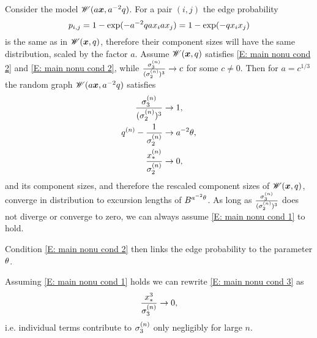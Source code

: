 Consider the model $\mathscr{W}(a\boldsymbol{x}, a^{-2}q)$.
For a pair $(i,j)$ the edge probability
\begin{equation}
	p_{i,j} = 1 - \exp(-a^{-2}q ax_iax_j) = 1 - \exp(-q x_ix_j)
\end{equation}
is the same as in $\mathscr{W}(\boldsymbol{x}, q)$,
therefore their component sizes will have the same distribution,
scaled by the factor $a$.
Assume $\mathscr{W}(\boldsymbol{x}, q)$ satisfies \eqref{E: main nonu cond 2} and \eqref{E: main nonu cond 2},
while $\frac{\sigma^{(n)}_3}{(\sigma^{(n)}_2)^3} \rightarrow c$ for some $c \neq 0$.
Then for $a = c^{1/3}$ the random graph $\mathscr{W}(a\boldsymbol{x}, a^{-2}q)$ satisfies
\begin{equation}
	\begin{aligned}
	\frac{\sigma^{(n)}_3}{(\sigma^{(n)}_2)^3} &\rightarrow 1, \\ 
	q^{(n)} - \frac{1}{\sigma^{(n)}_2} &\rightarrow a^{-2}\theta, \\
	\frac{x_*^{(n)}}{\sigma^{(n)}_2} &\rightarrow 0,
	\end{aligned}
\end{equation}
and its component sizes,
and therefore the rescaled component sizes of $\mathscr{W}(\boldsymbol{x}, q)$,
converge in distribution to excursion lengths of $B^{a^{-2}\theta}$.
As long as $\frac{\sigma^{(n)}_3}{(\sigma^{(n)}_2)^3}$ does not diverge or converge to zero,
we can always assume \eqref{E: main nonu cond 1} to hold.

Condition \eqref{E: main nonu cond 2} then links the edge probability to the parameter $\theta$.

Assuming \eqref{E: main nonu cond 1} holds we can rewrite \eqref{E: main nonu cond 3} as
\begin{equation}
	\frac{x_*^3}{\sigma^{(n)}_3} \rightarrow 0,
\end{equation}
i.e. individual terms contribute to $\sigma^{(n)}_3$ only negligibly for large $n$.

